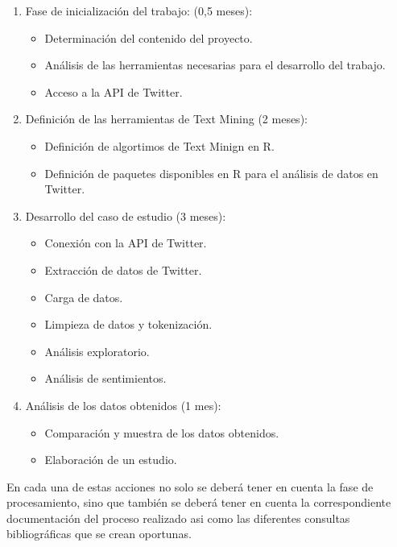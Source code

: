 \begin{enumerate}
\item Fase de inicialización del trabajo: (0,5 meses):
  
  \begin{itemize}
  \item Determinación del contenido del proyecto.
  \item Análisis de las herramientas necesarias para el desarrollo del trabajo.
  \item Acceso a la API de Twitter.
  \end{itemize}

\item Definición de las herramientas de Text Mining (2 meses):

  \begin{itemize}
  \item Definición de algortimos de Text Minign en R.
  \item Definición de paquetes disponibles en R para el análisis de datos en Twitter.
  \end{itemize}
  
\item Desarrollo del caso de estudio (3 meses):

 \begin{itemize}
  \item Conexión con la API de Twitter.
  \item Extracción de datos de Twitter.
  \item Carga de datos.
  \item Limpieza de datos y tokenización.
  \item Análisis exploratorio.
  \item Análisis de sentimientos.
  \end{itemize}

\item Análisis de los datos obtenidos (1 mes):

  \begin{itemize}
  \item Comparación y muestra de los datos obtenidos.
  \item Elaboración de un estudio.
  \end{itemize}

\end{enumerate}
En cada una de estas acciones no solo se deberá tener en cuenta la fase de procesamiento, sino que también se deberá tener 
en cuenta la correspondiente documentación del proceso realizado asi como las diferentes consultas bibliográficas que se crean 
oportunas.

